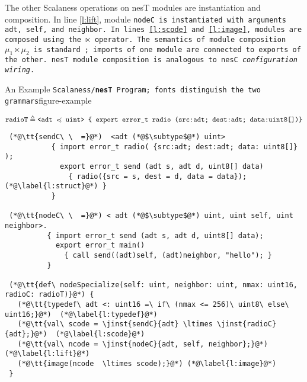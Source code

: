 The other Scalaness operations on nesT modules are instantiation and composition. In
line \ref{l:lift}, module \tt{nodeC} is instantiated with arguments
\tt{adt}, \tt{self}, and \tt{neighbor}. In lines \ref{l:scode} and
\ref{l:image}, modules are composed using the $\ltimes$ operator.
The semantics of module composition $\mu_1 \ltimes \mu_2$ is standard
\cite{Cardelli-1997}; imports of one module are connected
to exports of the other. nesT module composition is analogous to nesC
\emph{configuration wiring}.%
\begin{fpfig*}[t]{An Example \tt{Scalaness}/{\bf \texttt{nesT}} Program; fonts distinguish the two grammars}{figure-example}
\lstset{numbers=left, numberstyle=\tiny, stepnumber=1, numbersep=5pt, basicstyle=\ttfamily} 

{\scriptsize\bf
$$
\mathtt{radioT} \triangleq \texttt{<adt $\preccurlyeq$ uint> \{ export error\_t radio ({src:adt; dest:adt; data:uint8[]})\}} 
$$
\begin{lstlisting}
 (*@\tt{sendC\ \  =}@*)  <adt (*@$\subtype$@*) uint>  
           { import error_t radio( {src:adt; dest:adt; data: uint8[]} );       
             export error_t send (adt s, adt d, uint8[] data) 
               { radio({src = s, dest = d, data = data}); (*@\label{l:struct}@*) }
           }
 
 (*@\tt{nodeC\ \  =}@*) < adt (*@$\subtype$@*) uint, uint self, uint neighbor>.
          { import error_t send (adt s, adt d, uint8[] data); 
            export error_t main() 
              { call send((adt)self, (adt)neighbor, "hello"); }   
          }
 
 (*@\tt{def\ nodeSpecialize(self: uint, neighbor: uint, nmax: uint16, radioC: radioT)}@*) {
   (*@\tt{typedef\ adt <: uint16 =\ if\ (nmax <= 256)\ uint8\ else\ uint16;}@*)  (*@\label{l:typedef}@*)   
   (*@\tt{val\ scode = \jinst{sendC}{adt} \ltimes \jinst{radioC}{adt};}@*)  (*@\label{l:scode}@*)    
   (*@\tt{val\ ncode = \jinst{nodeC}{adt, self, neighbor};}@*) (*@\label{l:lift}@*)    
   (*@\tt{image(ncode  \ltimes scode);}@*) (*@\label{l:image}@*)   
 }
\end{lstlisting}}%
\end{fpfig*}


